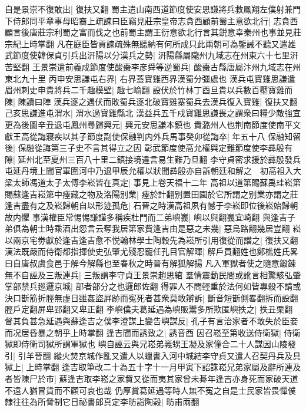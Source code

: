 自是景崇不復敢出|{
	復扶又翻}
蜀主遣山南西道節度使安思謙將兵救鳳翔左僕射兼門下侍郎同平章事母昭裔上疏諫曰臣竊見莊宗皇帝志貪西顧前蜀主意欲北行|{
	志貪西顧言後唐莊宗利蜀之富而伐之也前蜀主謂王衍意欲北行言其鋭意幸秦州也事並見莊宗紀上時掌翻}
凡在庭臣皆貢諫疏殊無聽納有何所成只此兩朝可為鑒誡不聽又遣雄武節度使韓保貞引兵出汧陽以分漢兵之勢|{
	汧陽縣屬隴州九域志在州東六十七里汧苦堅翻}
王景崇遣前義成節度使酸棗李彦舜等逆蜀兵|{
	酸棗古縣唐屬汴州九域志在州東北九十里}
丙申安思謙屯右界|{
	右界蓋寶雞西界漢蜀分彊處也}
漢兵屯寶雞思謙遣眉州刺史申貴將兵二千趣模壁|{
	趣七喻翻}
設伏於竹林丁酉旦貴以兵數百壓寶雞而陳|{
	陳讀曰陣}
漢兵逐之遇伏而敗蜀兵逐北破寶雞寨蜀兵去漢兵復入寶雞|{
	復扶又翻}
己亥思謙進屯渭水|{
	渭水過寶雞縣北}
漢益兵五千戍寶雞思謙畏之謂衆曰糧少敵強宜更為後圖辛丑退屯鳳州尋歸興元|{
	興元安思謙本鎮也}
貴潞州人也荆南節度使南平文獻王高從誨寢疾以其子節度副使保融判内外兵馬事癸卯從誨卒|{
	年五十八}
保融知留後|{
	保融從誨第三子史不言其得立之因}
彰武節度使高允權與定難節度使李彞殷有隙|{
	延州北至夏州三百八十里二鎮接境違言易生難乃旦翻}
李守貞密求援於彞殷發兵屯延丹境上聞官軍圍河中乃退甲辰允權以狀聞彞殷亦自訴朝廷和解之　初高祖入大梁太師馮道太子太傅李崧皆在真定|{
	事見上卷天福十二年}
高祖以道第賜蘇禹珪崧第賜蘇逢吉崧第中瘞藏之物及洛陽别業|{
	瘞於計翻别置田園於它所謂之别業亦謂之莊}
逢吉盡有之及崧歸朝自以形迹孤危|{
	石晉之時漢高祖夙有憾于李崧即位後崧始歸朝故内懼}
事漢權臣常惕惕謙謹多稱疾杜門而二弟嶼㠖|{
	嶼以與翻㠖宜崎翻}
與逢吉子弟俱為朝士時乘酒出怨言云奪我居第家貲逢吉由是惡之未幾|{
	惡烏路翻幾居豈翻}
崧以兩京宅劵獻於逢吉逢吉愈不悦翰林學士陶穀先為崧所引用復從而譛之|{
	復扶又翻}
漢法既嚴而侍衛都指揮使史弘肇尤殘忍寵任孔目官解暉|{
	解戶買翻姓也鄭樵姓氏畧曰自唐叔虞食邑于解今解縣也至春秋之時晉有解狐解揚}
凡入軍獄者使之隨意鍛鍊無不自誣及三叛連兵|{
	三叛謂李守貞王景崇趙思綰}
羣情震動民間或訛言相驚駭弘肇掌部禁兵廵邏京城|{
	部者部分之也邏郎佐翻}
得罪人不問輕重於法何如皆專殺不請或決口斮筋折脛無虚日雖姦盜屛跡而寃死者甚衆莫敢辯訴|{
	斷音短斮側畧翻拆而設翻脛戶定翻屏卑郢翻又卑正翻}
李嶼僕夫葛延遇為嶼販鬻多所欺匿嶼抶之|{
	抶丑栗翻}
督其負甚急延遇與蘇逢吉之僕李澄謀上變告嶼謀反|{
	孔子有言治家者不敢失於臣妾而况居昏暴之朝乎上時掌翻}
逢吉聞而誘致之|{
	誘音酉}
因召崧至第收送侍衛獄|{
	侍衛獄即侍衛司獄所謂軍獄也}
嶼自誣云與兄崧弟㠖甥王凝及家僮合二十人謀因山陵發引|{
	引羊晉翻}
縱火焚京城作亂又遣人以蠟書入河中城結李守貞又遣人召契丹兵及具獄上|{
	上時掌翻}
逢吉取筆改二十為五十字十一月甲寅下詔誅崧兄弟家屬及辭所連及者皆陳尸於市|{
	蘇逢吉取李崧之家貲又從而夷其家曾未朞年逢吉亦身死而家破天道不遠人猶冒貨而不顧可哀也哉}
仍厚賞葛延遇等時人無不寃之自是士民家皆畏憚僕隸往往為所脅制它日祕書郎真定李昉詣陶穀|{
	昉甫兩翻}
